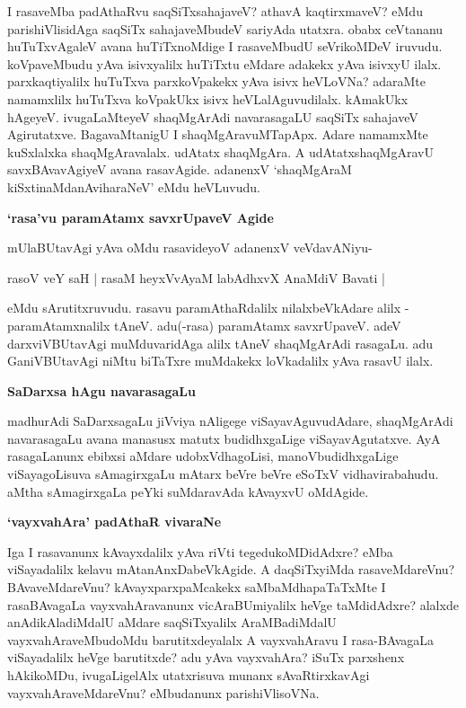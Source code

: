 \noindent
I rasaveMba padAthaRvu saqSiTxsahajaveV? athavA kaqtirxmaveV? eMdu parishiVlisidAga saqSiTx sahajaveMbudeV sariyAda utatxra. obabx ceVtananu huTuTxvAgaleV avana huTiTxnoMdige I rasaveMbudU seVrikoMDeV iruvudu. koVpaveMbudu yAva isivxyalilx huTiTxtu eMdare adakekx yAva isivxyU ilalx. parxkaqtiyalilx huTuTxva parxkoVpakekx yAva isivx heVLoVNa? adaraMte namamxlilx huTuTxva koVpakUkx isivx heVLalAguvudilalx. kAmakUkx hAgeyeV. ivugaLaMteyeV shaqMgArAdi navarasagaLU saqSiTx sahajaveV Agirutatxve. BagavaMtanigU I shaqMgAravuMTapApx. Adare namamxMte kuSxlalxka shaqMgAravalalx. udAtatx shaqMgAra. A udAtatxshaqMgAravU savxBAvavAgiyeV avana rasavAgide. adanenxV `shaqMgAraM kiSxtinaMdanAviharaNeV' eMdu heVLuvudu.

{\bigskip
\noindent
{\large\bf `rasa'vu paramAtamx savxrUpaveV Agide}}\label{page222b}
\medskip

\noindent
mUlaBUtavAgi yAva oMdu rasavideyoV adanenxV veVdavANiyu-

\begin{shloka}
rasoV veY saH | rasaM heyxVvAyaM labAdhxvX AnaMdiV Bavati |
\end{shloka}

\noindent
eMdu sArutitxruvudu. rasavu paramAthaRdalilx nilalxbeVkAdare alilx - paramAtamxnalilx tAneV. adu(-rasa) paramAtamx savxrUpaveV. adeV darxviVBUtavAgi muMduvaridAga alilx tAneV shaqMgArAdi rasagaLu. adu GaniVBUtavAgi niMtu biTaTxre muMdakekx loVkadalilx yAva rasavU ilalx.

{\bigskip
\noindent
{\large\bf SaDarxsa hAgu navarasagaLu}}\label{page223}
\medskip

\noindent
madhurAdi SaDarxsagaLu jiVviya nAligege viSayavAguvudAdare, shaqMgArAdi navarasagaLu avana manasusx matutx budidhxgaLige viSayavAgutatxve. AyA rasagaLanunx ebibxsi aMdare udobxVdhagoLisi, manoVbudidhxgaLige viSayagoLisuva sAmagirxgaLu mAtarx beVre beVre eSoTxV vidhavirabahudu. aMtha sAmagirxgaLa peYki suMdaravAda kAvayxvU oMdAgide. 

{\bigskip
\noindent
{\large\bf `vayxvahAra' padAthaR vivaraNe}}\label{page209b}
\medskip

\noindent
Iga I rasavanunx kAvayxdalilx yAva riVti tegedukoMDidAdxre? eMba viSayadalilx kelavu mAtanAnxDabeVkAgide. A daqSiTxyiMda rasaveMdareVnu? BAvaveMdareVnu? kAvayxparxpaMcakekx saMbaMdhapaTaTxMte I rasaBAvagaLa vayxvahAravanunx vicAraBUmiyalilx heVge taMdidAdxre? alalxde anAdikAladiMdalU aMdare saqSiTxyalilx AraMBadiMdalU vayxvahAraveMbudoMdu barutitxdeyalalx A vayxvahAravu I rasa-BAvagaLa viSayadalilx heVge barutitxde? adu yAva vayxvahAra? iSuTx parxshenx hAkikoMDu, ivugaLigelAlx utatxrisuva munanx sAvaRtirxkavAgi vayxvahAraveMdareVnu? eMbudanunx parishiVlisoVNa.

